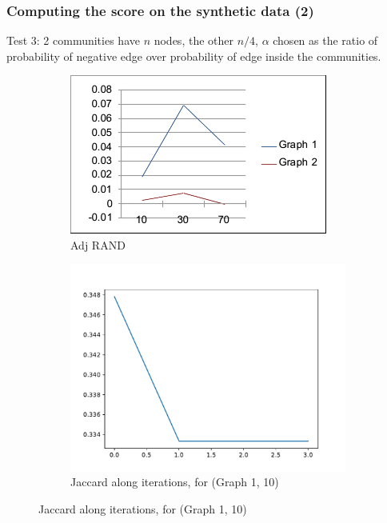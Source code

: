 \documentclass{beamer}
\begin{document}
\begin{frame}[c]
	\frametitle{Computing the score on the synthetic data (2)}
    Test 3: 2 communities have $n$ nodes, the other $n/4$, $\alpha$ chosen as
    the ratio of probability of negative edge over probability of edge inside
    the communities.

    \begin{figure}
        \begin{center}
            \begin{subfigure}[b]{0.4\textwidth}
                \centering
                \includegraphics[width=\textwidth]{img/model_3run.png}
                \caption{Adj RAND}
                \label{fig:img/model_1run.png}
            \end{subfigure}
            \begin{subfigure}[b]{0.4\textwidth}
                \centering
                \includegraphics[width=\textwidth]{out/synthetic3/model1_scores0_10.pdf}
                \caption{Jaccard along iterations, for (Graph 1, 10)}
                \label{fig:}
            \end{subfigure}
        \end{center}
        \end{figure}
\end{frame}
\end{document}
